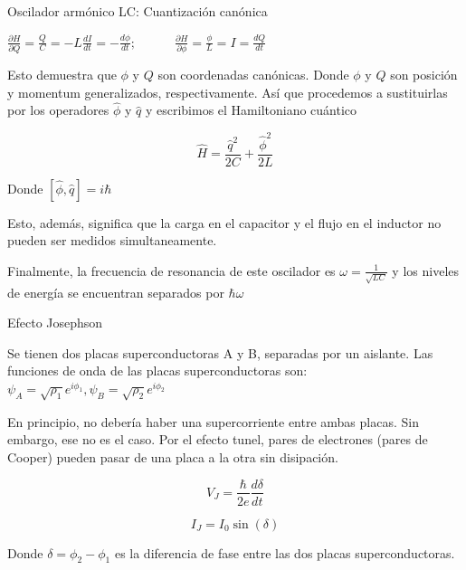 \begin{frame}{Oscilador armónico LC: Cuantización canónica}
\protect\hypertarget{oscilador-armuxf3nico-lc-cuantizaciuxf3n-canuxf3nica}{}

\(\frac{\partial H}{\partial Q} = \frac{Q}{C} = -L \frac{dI}{dt} =  -\frac{d\phi}{dt}; \qquad \quad  \frac{\partial H}{\partial \phi} = \frac{\phi}{L} = I = \frac{dQ}{dt}\)

Esto demuestra que \(\phi\) y \(Q\) son coordenadas canónicas. Donde
\(\phi\) y \(Q\) son posición y momentum generalizados, respectivamente.
Así que procedemos a sustituirlas por los operadores \(\hat{\phi}\) y
\(\hat{q}\) y escribimos el Hamiltoniano cuántico

\[\hat{H} = \frac{\hat{q}^2}{2C} + \frac{\hat{\phi}^2}{2L}\]

Donde \([\hat{\phi},\hat{q}]= i \hbar\)

Esto, además, significa que la carga en el capacitor y el flujo en el
inductor no pueden ser medidos simultaneamente.

Finalmente, la frecuencia de resonancia de este oscilador es
\(\omega = \frac{1}{\sqrt{L C}}\) y los niveles de energía se encuentran
separados por \(\hbar \omega\)

\end{frame}

\begin{frame}{Efecto Josephson}
\protect\hypertarget{efecto-josephson}{}

Se tienen dos placas superconductoras A y B, separadas por un aislante.
Las funciones de onda de las placas superconductoras son:
\(\psi_A = \sqrt{\rho_1} e^{i \phi_1}, \psi_B = \sqrt{\rho_2} e^{i \phi_2}\)

En principio, no debería haber una supercorriente entre ambas placas.
Sin embargo, ese no es el caso. Por el efecto tunel, pares de electrones
(pares de Cooper) pueden pasar de una placa a la otra sin disipación.

\[V_J = \frac{\hbar}{2e} \frac{d\delta}{dt}\]

\[I_J = I_0 \sin(\delta)\]

Donde \(\delta=\phi_2-\phi_1\) es la diferencia de fase entre las dos
placas superconductoras.

\end{frame}

